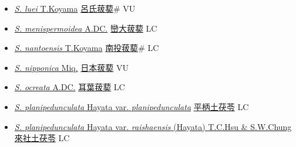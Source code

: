 \begin{itemize}
\begin{itemize}
        \item[] \href{http://www.theplantlist.org/tpl1.1/search?q=Smilax+luei}{\textit{S. luei} T.Koyama}   \href{\detokenize{http://taibnet.sinica.edu.tw/chi/taibnet_species_list.php?T2=呂氏菝葜&T2_new_value=true&fr=y}}{呂氏菝葜}\# VU
        \item[] \href{http://www.theplantlist.org/tpl1.1/search?q=Smilax+menispermoidea}{\textit{S. menispermoidea} A.DC.}   \href{\detokenize{http://taibnet.sinica.edu.tw/chi/taibnet_species_list.php?T2=巒大菝葜&T2_new_value=true&fr=y}}{巒大菝葜} LC
        \item[] \href{http://www.theplantlist.org/tpl1.1/search?q=Smilax+nantoensis}{\textit{S. nantoensis} T.Koyama}   \href{\detokenize{http://taibnet.sinica.edu.tw/chi/taibnet_species_list.php?T2=南投菝葜&T2_new_value=true&fr=y}}{南投菝葜}\# LC
        \item[] \href{http://www.theplantlist.org/tpl1.1/search?q=Smilax+nipponica}{\textit{S. nipponica} Miq.}   \href{\detokenize{http://taibnet.sinica.edu.tw/chi/taibnet_species_list.php?T2=日本菝葜&T2_new_value=true&fr=y}}{日本菝葜} VU
        \item[] \href{http://www.theplantlist.org/tpl1.1/search?q=Smilax+ocreata}{\textit{S. ocreata} A.DC.}   \href{\detokenize{http://taibnet.sinica.edu.tw/chi/taibnet_species_list.php?T2=耳葉菝葜&T2_new_value=true&fr=y}}{耳葉菝葜} LC
        \item[] \href{http://www.theplantlist.org/tpl1.1/search?q=Smilax+planipedunculata+var.+planipedunculata}{\textit{S. planipedunculata} Hayata var. \textit{planipedunculata}}   \href{\detokenize{http://taibnet.sinica.edu.tw/chi/taibnet_species_list.php?T2=平柄土茯苓&T2_new_value=true&fr=y}}{平柄土茯苓} LC
        \item[] \href{http://www.theplantlist.org/tpl1.1/search?q=Smilax+planipedunculata+var.+raishaensis}{\textit{S. planipedunculata} Hayata var. \textit{raishaensis} (Hayata) T.C.Hsu \& S.W.Chung}   \href{\detokenize{http://taibnet.sinica.edu.tw/chi/taibnet_species_list.php?T2=來社土茯苓&T2_new_value=true&fr=y}}{來社土茯苓} LC

\end{itemize}
\end{itemize}

